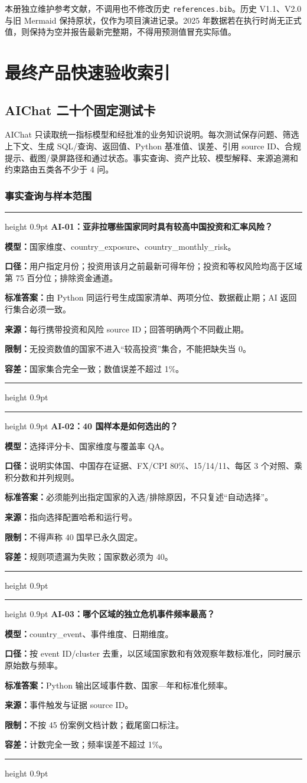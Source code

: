 \documentclass[UTF8,fontset=windows,12pt,openany]{ctexbook}
\newenvironment{decisionbox}[1][]{%
  \par\medskip\noindent\begin{center}\begin{minipage}{0.93\textwidth}%
  \color{OceanBlue}\hrule height 0.9pt\vspace{0.45em}%
  \textbf{#1}\par\smallskip\color{black}%
}{%
  \par\vspace{0.35em}\color{OceanBlue}\hrule height 0.9pt%
  \end{minipage}\end{center}\medskip%
}
\newcommand{\File}[1]{{\small\nolinkurl{#1}}}
\newcommand{\CardRow}[2]{\noindent\textbf{#1：}#2\par}
\begin{document}
本册独立维护参考文献，不调用也不修改历史 \File{references.bib}。历史 V1.1、V2.0 与旧 Mermaid 保持原状，仅作为项目演进记录。2025 年数据若在执行时尚无正式值，则保持为空并报告最新完整期，不得用预测值冒充实际值。

\tableofcontents
\listoftables

\mainmatter
\part{最终产品快速验收索引}

\chapter{AIChat 二十个固定测试卡}

AIChat 只读取统一指标模型和经批准的业务知识说明。每次测试保存问题、筛选上下文、生成 SQL/查询、返回值、Python 基准值、误差、引用 source ID、合规提示、截图/录屏路径和通过状态。事实查询、资产比较、模型解释、来源追溯和约束路由五类各不少于 4 问。

\section{事实查询与样本范围}

\begin{decisionbox}[AI-01：亚非拉哪些国家同时具有较高中国投资和汇率风险？]
\CardRow{模型}{国家维度、country\_exposure、country\_monthly\_risk。}
\CardRow{口径}{用户指定月份；投资用该月之前最新可得年份；投资和等权风险均高于区域第 75 百分位；排除资金通道。}
\CardRow{标准答案}{由 Python 同运行号生成国家清单、两项分位、数据截止期；AI 返回行集合必须一致。}
\CardRow{来源}{每行携带投资和风险 source ID；回答明确两个不同截止期。}
\CardRow{限制}{无投资数值的国家不进入“较高投资”集合，不能把缺失当 0。}
\CardRow{容差}{国家集合完全一致；数值误差不超过 1\%。}
\end{decisionbox}

\begin{decisionbox}[AI-02：40 国样本是如何选出的？]
\CardRow{模型}{选择评分卡、国家维度与覆盖率 QA。}
\CardRow{口径}{说明实体国、中国存在证据、FX/CPI 80\%、15/14/11、每区 3 个对照、乘积分数和并列规则。}
\CardRow{标准答案}{必须能列出指定国家的入选/排除原因，不只复述“自动选择”。}
\CardRow{来源}{指向选择配置哈希和运行号。}
\CardRow{限制}{不得声称 40 国早已永久固定。}
\CardRow{容差}{规则项遗漏为失败；国家数必须为 40。}
\end{decisionbox}

\begin{decisionbox}[AI-03：哪个区域的独立危机事件频率最高？]
\CardRow{模型}{country\_event、事件维度、日期维度。}
\CardRow{口径}{按 event ID/cluster 去重，以区域国家数和有效观察年数标准化，同时展示原始数与频率。}
\CardRow{标准答案}{Python 输出区域事件数、国家—年和标准化频率。}
\CardRow{来源}{事件触发与证据 source ID。}
\CardRow{限制}{不按 45 份案例文档计数；截尾窗口标注。}
\CardRow{容差}{计数完全一致；频率误差不超过 1\%。}
\end{decisionbox}
\end{document}
